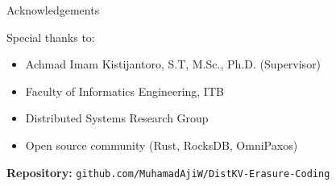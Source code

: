 \documentclass[a0,landscape]{config/poster/a0poster}
\newcommand{\postersection}[1]{%
  \begin{tcolorbox}[
      colback=ITBblue,
      colframe=ITBblue,
      fonttitle=\bfseries,
      coltext=white,
      sharp corners,
      boxrule=0pt,
      top=6pt,
      bottom=6pt,
      halign=center
    ]
    \Large #1
  \end{tcolorbox}%
}
\begin{document}
\begin{multicols}{4}
	\postersection{Acknowledgements}
	
	Special thanks to:
	\begin{itemize}
		\item Achmad Imam Kistijantoro, S.T, M.Sc., Ph.D. (Supervisor)
		\item Faculty of Informatics Engineering, ITB
		\item Distributed Systems Research Group
		\item Open source community (Rust, RocksDB, OmniPaxos)
	\end{itemize}

	\vspace{0.5cm}
	\textbf{Repository:} \texttt{github.com/MuhamadAjiW/DistKV-Erasure-Coding}

\end{multicols}
\end{document}
